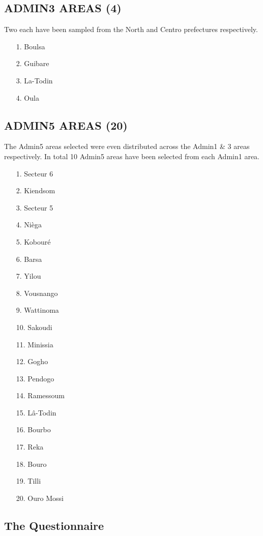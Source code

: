 \documentclass[11pt,harvard]{article}
\begin{document}
\subsection*{ADMIN3 AREAS (4)}
Two each have been sampled from the North and Centro prefectures respectively.

\begin{itemize}[left=2.0em]
	\item[1.]Boulsa
	\item[2.]Guibare
	\item[3.]La-Todin
	\item[4.]Oula
\end{itemize}

\subsection*{ADMIN5 AREAS (20)}
The Admin5 areas selected were even distributed across the Admin1 \& 3 areas respectively. In total 10 Admin5 areas have been selected from each Admin1 area.

\begin{itemize}[left=2.0em]
	\item[1.]Secteur 6
	\item[2.]Kiendsom
	\item[3.]Secteur 5
	\item[4.]Nièga
	\item[5.]Kobouré
	\item[6.]Barsa
	\item[7.]Yilou
	\item[8.]Vousnango
	\item[9.]Wattinoma
	\item[10.]Sakoudi
	\item[11.]Minissia
	\item[12.]Gogho
	\item[13.]Pendogo
	\item[14.]Ramessoum
	\item[15.]Lâ-Todin
	\item[16.]Bourbo
	\item[17.]Reka
	\item[18.]Bouro
	\item[19.]Tilli
	\item[20.]Ouro Mossi 
\end{itemize}


\subsection*{The Questionnaire}
\end{document}
